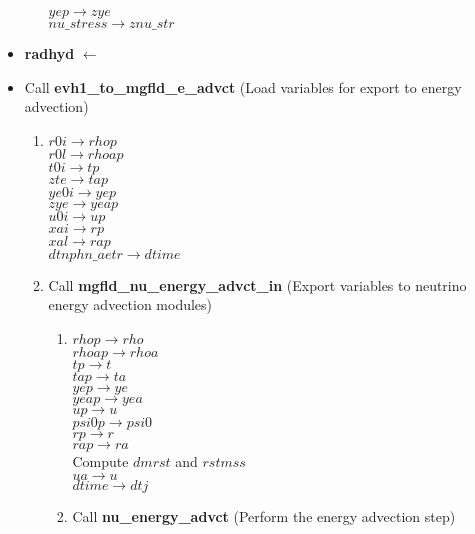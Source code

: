 \documentclass[11pt,doublespace]{article}
\begin{document}
\begin{itemize}
\begin{enumerate}
           $yep \rightarrow zye$\\
           $nu\_stress \rightarrow znu\_str$\\
\end{enumerate}
  \item {\bf radhyd} $\leftarrow$
  \item Call {\bf evh1\_to\_mgfld\_e\_advct} (Load variables for export to energy advection)
\begin{enumerate}
  \item $r0i \rightarrow rhop$\\
            $r0l \rightarrow rhoap$\\
            $t0i \rightarrow tp$\\
            $zte \rightarrow tap$\\
            $ye0i \rightarrow yep$\\
            $zye \rightarrow yeap$\\
            $u0i \rightarrow up$\\
            $xai \rightarrow rp$\\
            $xal \rightarrow rap$\\
            $dtnphn\_aetr \rightarrow dtime$
  \item Call {\bf mgfld\_nu\_energy\_advct\_in} (Export variables to neutrino energy advection modules)
\begin{enumerate}
  \item $rhop \rightarrow rho$\\
            $rhoap \rightarrow rhoa$\\
            $tp \rightarrow t$\\
            $tap \rightarrow ta$\\
            $yep \rightarrow ye$\\
            $yeap \rightarrow yea$\\
            $up \rightarrow u$\\
            $psi0p \rightarrow psi0$\\
            $rp \rightarrow r$\\
            $rap \rightarrow ra$\\
            Compute $dmrst$ and $rstmss$\\
            $ua \rightarrow u$\\
            $dtime \rightarrow dtj$
  \item Call {\bf nu\_energy\_advct} (Perform the energy advection step)
\begin{enumerate}

\end{enumerate}
\end{enumerate}
\end{enumerate}
\end{itemize}
\end{document}
